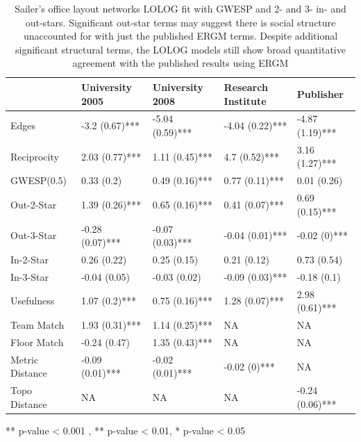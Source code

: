 \documentclass[
]{statsoc}
\begin{document}
\begin{table}

\caption{\label{tab:unnamed-chunk-4}\label{tab:sailer_lolog_gwesp_star}
      Sailer's office layout networks LOLOG fit with GWESP and 2- and 3- in- and out-stars. Significant out-star terms may suggest there is social structure unaccounted for with just the published ERGM terms. Despite additional significant structural terms, the LOLOG models still show broad quantitative agreement with the published results using ERGM}
\centering
\begin{threeparttable}
\begin{tabular}[t]{lllll}
\toprule
  & University 2005 & University 2008 & Research Institute & Publisher\\
\midrule
\rowcolor{gray!6}  Edges & -3.2 (0.67)*** & -5.04 (0.59)*** & -4.04 (0.22)*** & -4.87 (1.19)***\\
Reciprocity & 2.03 (0.77)*** & 1.11 (0.45)*** & 4.7 (0.52)*** & 3.16 (1.27)***\\
\rowcolor{gray!6}  GWESP(0.5) & 0.33 (0.2) & 0.49 (0.16)*** & 0.77 (0.11)*** & 0.01 (0.26)\\
Out-2-Star & 1.39 (0.26)*** & 0.65 (0.16)*** & 0.41 (0.07)*** & 0.69 (0.15)***\\
\rowcolor{gray!6}  Out-3-Star & -0.28 (0.07)*** & -0.07 (0.03)*** & -0.04 (0.01)*** & -0.02 (0)***\\
\addlinespace
In-2-Star & 0.26 (0.22) & 0.25 (0.15) & 0.21 (0.12) & 0.73 (0.54)\\
\rowcolor{gray!6}  In-3-Star & -0.04 (0.05) & -0.03 (0.02) & -0.09 (0.03)*** & -0.18 (0.1)\\
Usefulness & 1.07 (0.2)*** & 0.75 (0.16)*** & 1.28 (0.07)*** & 2.98 (0.61)***\\
\rowcolor{gray!6}  Team Match & 1.93 (0.31)*** & 1.14 (0.25)*** & NA & NA\\
Floor Match & -0.24 (0.47) & 1.35 (0.43)*** & NA & NA\\
\addlinespace
\rowcolor{gray!6}  Metric Distance & -0.09 (0.01)*** & -0.02 (0.01)*** & -0.02 (0)*** & NA\\
Topo Distance & NA & NA & NA & -0.24 (0.06)***\\
\bottomrule
\end{tabular}
\begin{tablenotes}
\item *** p-value < 0.001 , ** p-value < 0.01, * p-value < 0.05
\end{tablenotes}
\end{threeparttable}
\end{table}
\end{document}
